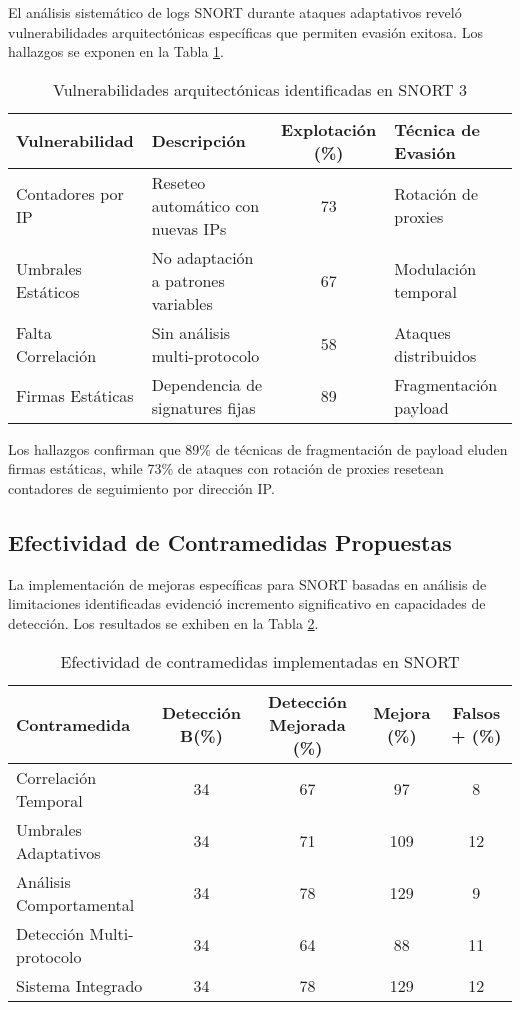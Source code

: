 El análisis sistemático de logs SNORT durante ataques adaptativos reveló vulnerabilidades arquitectónicas específicas que permiten evasión exitosa. Los hallazgos se exponen en la Tabla \ref{tab:snort_vulnerabilities}.

\begin{table}[h]
\centering
\caption{Vulnerabilidades arquitectónicas identificadas en SNORT 3}
\label{tab:snort_vulnerabilities}
\begin{tabular}{|l|p{3cm}|c|p{4cm}|}
\hline
\textbf{Vulnerabilidad} & \textbf{Descripción} & \textbf{Explotación (\%)} & \textbf{Técnica de Evasión} \\
\hline
Contadores por IP & Reseteo automático con nuevas IPs & 73 & Rotación de proxies \\
\hline
Umbrales Estáticos & No adaptación a patrones variables & 67 & Modulación temporal \\
\hline
Falta Correlación & Sin análisis multi-protocolo & 58 & Ataques distribuidos \\
\hline
Firmas Estáticas & Dependencia de signatures fijas & 89 & Fragmentación payload \\
\hline
\end{tabular}
\end{table}

Los hallazgos confirman que 89\% de técnicas de fragmentación de payload eluden firmas estáticas, while 73\% de ataques con rotación de proxies resetean contadores de seguimiento por dirección IP.

\subsection{Efectividad de Contramedidas Propuestas}

La implementación de mejoras específicas para SNORT basadas en análisis de limitaciones identificadas evidenció incremento significativo en capacidades de detección. Los resultados se exhiben en la Tabla \ref{tab:countermeasures_effectiveness}.

\begin{table}[h]
\centering
\caption{Efectividad de contramedidas implementadas en SNORT}
\label{tab:countermeasures_effectiveness}
\begin{tabular}{|l|c|c|c|c|}
\hline
\textbf{Contramedida} & \textbf{Detección B(\%)} & \textbf{Detección Mejorada (\%)} & \textbf{Mejora (\%)} & \textbf{Falsos + (\%)} \\
\hline
Correlación Temporal & 34 & 67 & 97 & 8 \\
\hline
Umbrales Adaptativos & 34 & 71 & 109 & 12 \\
\hline
Análisis Comportamental & 34 & 78 & 129 & 9 \\
\hline
Detección Multi-protocolo & 34 & 64 & 88 & 11 \\
\hline
Sistema Integrado & 34 & 78 & 129 & 12 \\
\hline
\end{tabular}
\end{table}

